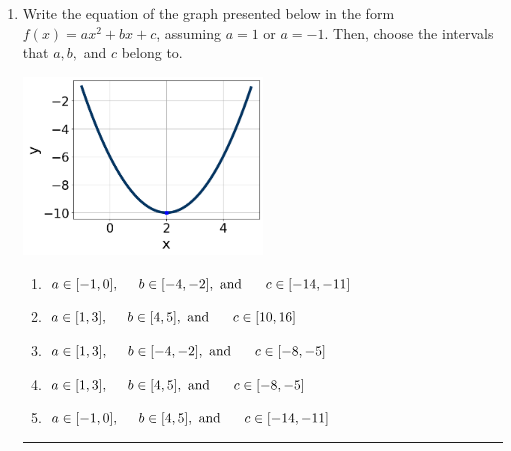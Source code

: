 \documentclass[14pt]{extbook}
\newcommand{\litem}[1]{\item#1\hspace*{-1cm}\rule{\textwidth}{0.4pt}}
\begin{document}
\begin{enumerate}
{\begin{enumerate}[label=\Alph*.]
\end{enumerate} }
\litem{
Write the equation of the graph presented below in the form $f(x)=ax^2+bx+c$, assuming  $a=1$ or $a=-1$. Then, choose the intervals that $a, b,$ and $c$ belong to.
\begin{center}
    \includegraphics[width=0.5\textwidth]{../Figures/quadraticGraphToEquationCopyB.png}
\end{center}
\begin{enumerate}[label=\Alph*.]
\item \( a \in [-1, 0], \hspace*{5mm} b \in [-4, -2], \text{ and } \hspace*{5mm} c \in [-14, -11] \)
\item \( a \in [1, 3], \hspace*{5mm} b \in [4, 5], \text{ and } \hspace*{5mm} c \in [10, 16] \)
\item \( a \in [1, 3], \hspace*{5mm} b \in [-4, -2], \text{ and } \hspace*{5mm} c \in [-8, -5] \)
\item \( a \in [1, 3], \hspace*{5mm} b \in [4, 5], \text{ and } \hspace*{5mm} c \in [-8, -5] \)
\item \( a \in [-1, 0], \hspace*{5mm} b \in [4, 5], \text{ and } \hspace*{5mm} c \in [-14, -11] \)


\end{enumerate}}
\end{enumerate}
\end{document}
